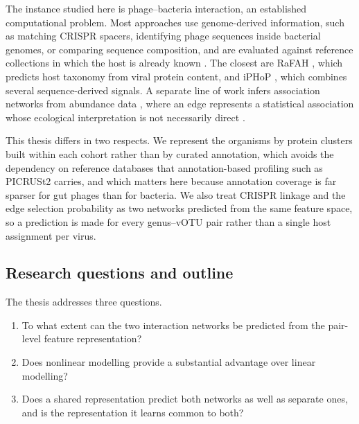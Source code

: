 The instance studied here is phage--bacteria interaction, an established computational problem. Most
approaches use genome-derived information, such as matching CRISPR spacers, identifying phage sequences
inside bacterial genomes, or comparing sequence composition, and are evaluated against reference
collections in which the host is already known \citep{edwards2016,nie2024,shang2025}. The closest are
RaFAH \citep{coutinho2021}, which predicts host taxonomy from viral protein content, and iPHoP
\citep{roux2023}, which combines several sequence-derived signals. A separate line of work infers
association networks from abundance data \citep{kurtz2015}, where an edge represents a statistical
association whose ecological interpretation is not necessarily direct
\citep{coenen2018,pinto2022,alrasheed2019}.

This thesis differs in two respects. We represent the organisms by protein clusters built within each
cohort rather than by curated annotation, which avoids the dependency on reference databases that
annotation-based profiling such as PICRUSt2 \citep{douglas2020} carries, and which matters here because
annotation coverage is far sparser for gut phages than for bacteria. We also treat CRISPR linkage and the
edge selection probability as two networks predicted from the same feature space, so a prediction is made
for every genus--vOTU pair rather than a single host assignment per virus.

\subsection{Research questions and outline}
\label{intro:questions}
The thesis addresses three questions.

\begin{enumerate}
  \item To what extent can the two interaction networks be predicted from the pair-level feature representation?
  \item Does nonlinear modelling provide a substantial advantage over linear modelling?
  \item Does a shared representation predict both networks as well as separate ones, and is the
        representation it learns common to both?
\end{enumerate}
